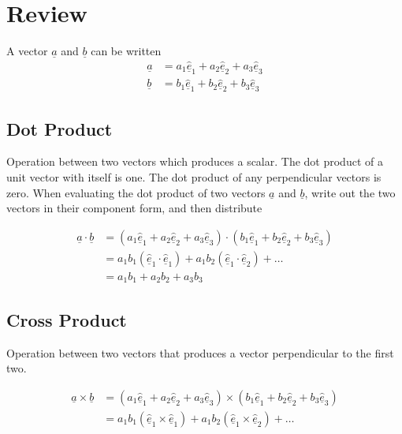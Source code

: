 \section{Review}

A vector $\underline{a}$ and $\underline{b}$ can be written
\begin{equation*}
  \begin{split}
    \underline{a}&=a_{1}\underline{\hat{e}}_{1}+a_{2}\underline{\hat{e}}_{2}+a_{3}\underline{\hat{e}}_{3} \\
    \underline{b}&=b_{1}\underline{\hat{e}}_{1}+b_{2}\underline{\hat{e}}_{2}+b_{3}\underline{\hat{e}}_{3}
  \end{split}
\end{equation*}

\subsection{Dot Product}

Operation between two vectors which produces a scalar.
The dot product of a unit vector with itself is one.
The dot product of any perpendicular vectors is zero.
When evaluating the dot product of two vectors $\underline{a}$ and $\underline{b}$, write out the two vectors in their component form, and then distribute

\begin{equation*}
  \begin{split}
    \underline{a}\cdot\underline{b}
    &=
    (a_{1}\underline{\hat{e}}_{1}+a_{2}\underline{\hat{e}}_{2}+a_{3}\underline{\hat{e}}_{3})\cdot
    (b_{1}\underline{\hat{e}}_{1}+b_{2}\underline{\hat{e}}_{2}+b_{3}\underline{\hat{e}}_{3}) \\
    &=a_{1}b_{1}(\underline{\hat{e}}_{1}\cdot\underline{\hat{e}}_{1})+a_{1}b_{2}(\underline{\hat{e}}_{1}\cdot\underline{\hat{e}}_{2})+\dots \\
    &=a_{1}b_{1}+a_{2}b_{2}+a_{3}b_{3}
  \end{split}
\end{equation*}

\subsection{Cross Product}

Operation between two vectors that produces a vector perpendicular to the first two.

\begin{equation*}
  \begin{split}
    \underline{a}\times\underline{b}
    &=
    (a_{1}\underline{\hat{e}}_{1}+a_{2}\underline{\hat{e}}_{2}+a_{3}\underline{\hat{e}}_{3})\times
    (b_{1}\underline{\hat{e}}_{1}+b_{2}\underline{\hat{e}}_{2}+b_{3}\underline{\hat{e}}_{3}) \\
    &=
    a_{1}b_{1}(\underline{\hat{e}}_{1}\times\underline{\hat{e}}_{1})+a_{1}b_{2}(\underline{\hat{e}}_{1}\times\underline{\hat{e}}_{2})+\dots \\
  \end{split}
\end{equation*}


